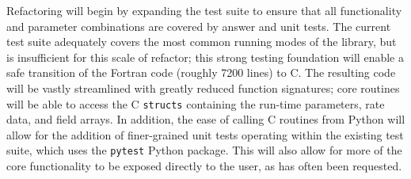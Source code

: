 Refactoring \grackle{} will begin by expanding the test suite to ensure that
all functionality and parameter combinations are covered by answer and unit
tests.  The current test suite adequately covers the most common running modes
of the library, but is insufficient for this scale of refactor; this strong
testing foundation will enable a safe transition of the Fortran code (roughly
7200 lines) to C.  The resulting code will be vastly streamlined with greatly
reduced function signatures; core routines will be able to access the C
\texttt{structs} containing the run-time parameters, rate data, and field
arrays.  In addition, the ease of calling C routines from Python will allow for
the addition of finer-grained unit tests operating within the existing test
suite, which uses the \texttt{pytest} Python package.  This will also allow for
more of the core functionality to be exposed directly to the user, as has often
been requested.


